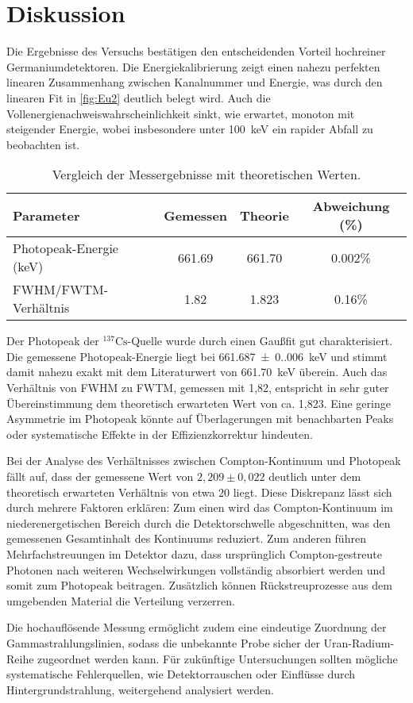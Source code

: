 \section{Diskussion}\label{sec:diskussion}
Die Ergebnisse des Versuchs bestätigen den entscheidenden Vorteil hochreiner Germaniumdetektoren. Die Energiekalibrierung zeigt einen nahezu perfekten linearen Zusammenhang zwischen Kanalnummer und Energie, was durch den linearen Fit in \autoref{fig:Eu2} deutlich belegt wird. Auch die Vollenergienachweiswahrscheinlichkeit sinkt, wie erwartet, monoton mit steigender Energie, wobei insbesondere unter \SI{100}{keV} ein rapider Abfall zu beobachten ist.
\begin{table}[h!]
    \centering
    \caption{Vergleich der Messergebnisse mit theoretischen Werten.}
    \label{tab:vergleich}
    \begin{tabular}{lccc}
      \toprule
      Parameter & Gemessen & Theorie & Abweichung (\%) \\
      \midrule
      Photopeak-Energie (keV) & 661.69 & 661.70 & 0.002\% \\
      FWHM/FWTM-Verhältnis    & 1.82   & 1.823  & 0.16\% \\
      \bottomrule
    \end{tabular}
  \end{table}
Der Photopeak der $^{137}\text{Cs}$-Quelle wurde durch einen Gaußfit gut charakterisiert. Die gemessene Photopeak-Energie liegt bei \SI{661.687(0.006)}{keV} und stimmt damit nahezu exakt mit dem Literaturwert von \SI{661.70}{keV} überein. Auch das Verhältnis von FWHM zu FWTM, gemessen mit 1,82, entspricht in sehr guter Übereinstimmung dem theoretisch erwarteten Wert von ca. 1,823. Eine geringe Asymmetrie im Photopeak könnte auf Überlagerungen mit benachbarten Peaks oder systematische Effekte in der Effizienzkorrektur hindeuten.

Bei der Analyse des Verhältnisses zwischen Compton-Kontinuum und Photopeak fällt auf, dass der gemessene Wert von $2,209 \pm 0,022$ deutlich unter dem theoretisch erwarteten Verhältnis von etwa 20 liegt. Diese Diskrepanz lässt sich durch mehrere Faktoren erklären: Zum einen wird das Compton-Kontinuum im niederenergetischen Bereich durch die Detektorschwelle abgeschnitten, was den gemessenen Gesamtinhalt des Kontinuums reduziert. Zum anderen führen Mehrfachstreuungen im Detektor dazu, dass ursprünglich Compton-gestreute Photonen nach weiteren Wechselwirkungen vollständig absorbiert werden und somit zum Photopeak beitragen. Zusätzlich können Rückstreuprozesse aus dem umgebenden Material die Verteilung verzerren.

Die hochauflösende Messung ermöglicht zudem eine eindeutige Zuordnung der Gammastrahlungslinien, sodass die unbekannte Probe sicher der Uran-Radium-Reihe zugeordnet werden kann. Für zukünftige Untersuchungen sollten mögliche systematische Fehlerquellen, wie Detektorrauschen oder Einflüsse durch Hintergrundstrahlung, weitergehend analysiert werden.

